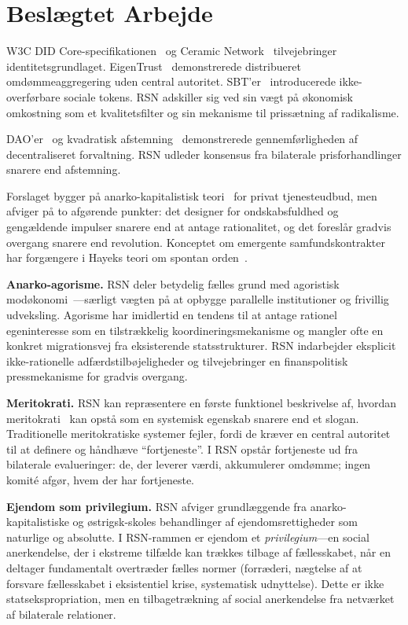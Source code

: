 \documentclass[11pt,a4paper,twocolumn]{article}
\begin{document}
\section{Beslægtet Arbejde}

W3C DID Core-specifikationen~\cite{did2022} og Ceramic Network~\cite{ceramic2023} tilvejebringer identitetsgrundlaget. EigenTrust~\cite{kamvar2003} demonstrerede distribueret omdømmeaggregering uden central autoritet. SBT'er~\cite{weyl2022} introducerede ikke-overførbare sociale tokens. RSN adskiller sig ved sin vægt på økonomisk omkostning som et kvalitetsfilter og sin mekanisme til prissætning af radikalisme.

DAO'er~\cite{buterin2014} og kvadratisk afstemning~\cite{buterin2019} demonstrerede gennemførligheden af decentraliseret forvaltning. RSN udleder konsensus fra bilaterale prisforhandlinger snarere end afstemning.

Forslaget bygger på anarko-kapitalistisk teori~\cite{rothbard1973,hoppe2001} for privat tjenesteudbud, men afviger på to afgørende punkter: det designer for ondskabsfuldhed og gengældende impulser snarere end at antage rationalitet, og det foreslår gradvis overgang snarere end revolution. Konceptet om emergente samfundskontrakter har forgængere i Hayeks teori om spontan orden~\cite{hayek1973}.

\textbf{Anarko-agorisme.} RSN deler betydelig fælles grund med agoristisk modøkonomi~\cite{konkin2006}---særligt vægten på at opbygge parallelle institutioner og frivillig udveksling. Agorisme har imidlertid en tendens til at antage rationel egeninteresse som en tilstrækkelig koordineringsmekanisme og mangler ofte en konkret migrationsvej fra eksisterende statsstrukturer. RSN indarbejder eksplicit ikke-rationelle adfærdstilbøjeligheder og tilvejebringer en finanspolitisk pressmekanisme for gradvis overgang.

\textbf{Meritokrati.} RSN kan repræsentere en første funktionel beskrivelse af, hvordan meritokrati~\cite{young1958} kan opstå som en systemisk egenskab snarere end et slogan. Traditionelle meritokratiske systemer fejler, fordi de kræver en central autoritet til at definere og håndhæve ``fortjeneste''. I RSN opstår fortjeneste ud fra bilaterale evalueringer: de, der leverer værdi, akkumulerer omdømme; ingen komité afgør, hvem der har fortjeneste.

\textbf{Ejendom som privilegium.} RSN afviger grundlæggende fra anarko-kapitalistiske og østrigsk-skoles behandlinger af ejendomsrettigheder som naturlige og absolutte. I RSN-rammen er ejendom et \emph{privilegium}---en social anerkendelse, der i ekstreme tilfælde kan trækkes tilbage af fællesskabet, når en deltager fundamentalt overtræder fælles normer (forræderi, nægtelse af at forsvare fællesskabet i eksistentiel krise, systematisk udnyttelse). Dette er ikke statsekspropriation, men en tilbagetrækning af social anerkendelse fra netværket af bilaterale relationer.
\end{document}
